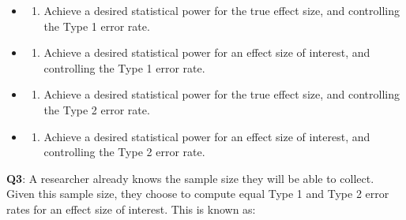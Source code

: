 \documentclass[
  letterpaper,
  DIV=11,
  numbers=noendperiod]{scrreprt}
\providecommand{\tightlist}{%
  \setlength{\itemsep}{0pt}\setlength{\parskip}{0pt}}\usepackage{longtable,booktabs,array}
\begin{document}
\begin{itemize}
\item
  \begin{enumerate}
  \def\labelenumi{(\Alph{enumi})}
  \tightlist
  \item
    Achieve a desired statistical power for the true effect size, and
    controlling the Type 1 error rate.\\
  \end{enumerate}
\item
  \begin{enumerate}
  \def\labelenumi{(\Alph{enumi})}
  \setcounter{enumi}{1}
  \tightlist
  \item
    Achieve a desired statistical power for an effect size of interest,
    and controlling the Type 1 error rate.\\
  \end{enumerate}
\item
  \begin{enumerate}
  \def\labelenumi{(\Alph{enumi})}
  \setcounter{enumi}{2}
  \tightlist
  \item
    Achieve a desired statistical power for the true effect size, and
    controlling the Type 2 error rate.\\
  \end{enumerate}
\item
  \begin{enumerate}
  \def\labelenumi{(\Alph{enumi})}
  \setcounter{enumi}{3}
  \tightlist
  \item
    Achieve a desired statistical power for an effect size of interest,
    and controlling the Type 2 error rate.\\
  \end{enumerate}
\end{itemize}

\textbf{Q3}: A researcher already knows the sample size they will be
able to collect. Given this sample size, they choose to compute equal
Type 1 and Type 2 error rates for an effect size of interest. This is
known as:
\end{document}

